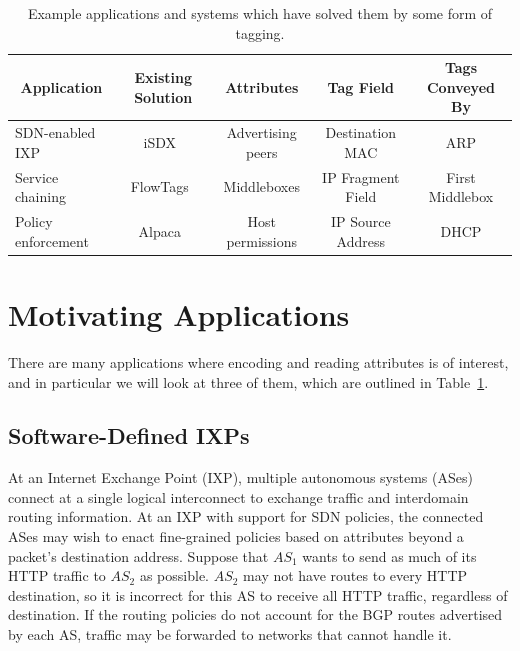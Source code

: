 \begin{table}
\begin{center}
    \begin{tabular}{|l|c|c|c|c|}
    \hline
    \multicolumn{1}{|c|}{\bf Application} & 
    \multicolumn{1}{c|}{\bf Existing Solution} & 
    \multicolumn{1}{c|}{\bf Attributes} & 
    \multicolumn{1}{c|}{\bf Tag Field} & 
    \multicolumn{1}{c|}{\bf Tags Conveyed By}\\ \hline
    SDN-enabled IXP & iSDX~\cite{isdx} & Advertising peers & Destination MAC & ARP \\ \hline
    Service chaining & FlowTags~\cite{flowtags} & Middleboxes & IP Fragment Field & First Middlebox \\ \hline
    Policy enforcement & Alpaca~\cite{alpaca} & Host permissions & IP Source Address & DHCP \\ \hline
    \end{tabular}
\end{center}
    \caption{Example applications and systems which have solved them by some form of tagging.} 
    \label{tab:applications}
\end{table}

\section{Motivating Applications}
\label{sec:motivation}

There are many applications where encoding and reading attributes is
of interest, and in particular we will look at three of them, which
are outlined in Table~\ref{tab:applications}.
 
\subsection{Software-Defined IXPs}

At an Internet Exchange Point (IXP), multiple autonomous systems (ASes)
connect at a single logical interconnect to exchange traffic and
interdomain routing information.  At an IXP with support for SDN
policies, the connected ASes may wish to enact fine-grained 
policies based on attributes beyond a packet's destination
address. Suppose that $AS_1$ wants to send as much of its HTTP traffic
to $AS_2$ as possible. $AS_2$ may not have routes to every HTTP
destination, so it is incorrect for this AS to receive all HTTP traffic,
regardless of destination. If
the routing policies do not account for the BGP routes advertised by each 
AS, traffic may be forwarded to networks that cannot handle it.

